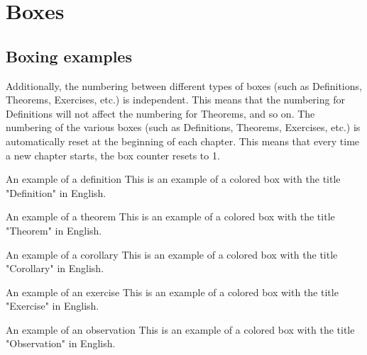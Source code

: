 \chapter{Boxes}
\section{Boxing examples}

Additionally, the numbering between different types of boxes (such as Definitions, Theorems, Exercises, etc.) is independent. This means that the numbering for Definitions will not affect the numbering for Theorems, and so on.
The numbering of the various boxes (such as Definitions, Theorems, Exercises, etc.) is automatically reset at the beginning of each chapter. This means that every time a new chapter starts, the box counter resets to 1.

\begin{definition}{An example of a definition}
  This is an example of a colored box with the title "Definition" in English.
\end{definition}

\begin{theorem}{An example of a theorem}
  This is an example of a colored box with the title "Theorem" in English.
\end{theorem}

\begin{corollary}{An example of a corollary}
  This is an example of a colored box with the title "Corollary" in English.
\end{corollary}

\begin{exercise}{An example of an exercise}
  This is an example of a colored box with the title "Exercise" in English.
\end{exercise}

\begin{observation}{An example of an observation}
  This is an example of a colored box with the title "Observation" in English.
\end{observation}

